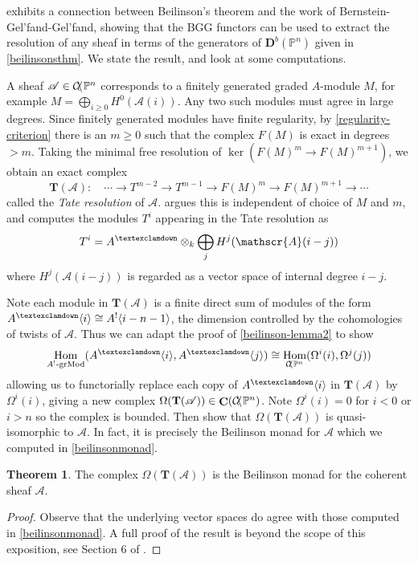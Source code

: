 \documentclass[a4paper]{article}
\theoremstyle{definition}
\newtheorem{theorem}[defn]{Theorem}
\theoremstyle{remark}
\newcommand{\grMod}{\ensuremath{\text{-grMod}}}
\DeclareMathOperator{\Hom}{\text{Hom}}
\DeclareMathOperator{\Ch}{\mathbf{C}}
\newcommand{\deri}{\mathbf{D}}
\newcommand{\Pn}{\ensuremath{{\mathbb{P}^n}}}
\DeclareMathOperator{\coh}{\mathcal{C\kern -2pt o\kern -2pt h\kern -1pt}}
\newcommand{\gnab}{{\textexclamdown}}
\begin{document}
 exhibits a connection between Beilinson's
theorem and the work of Bernstein-Gel'fand-Gel'fand, showing that the BGG
functors can be used to extract the resolution of any sheaf in terms of the
generators of \(\deri^b(\Pn)\) given in \cref{beilinsonsthm}. We state the
result, and look at some computations.

A sheaf \(\mathscr{A}\in \coh\Pn\) corresponds to a finitely generated graded
\(A\)-module \(M\), for example \(M=\bigoplus_{i\geq 0}H^0(\mathscr{A}(i))\).
Any two such modules must agree in large degrees. Since finitely generated
modules have finite regularity, by \cref{regularity-criterion} there is an
\(m\geq 0\) such that the complex \(F(M)\) is exact in degrees \(>m\). Taking
the minimal free resolution of \(\ker(F(M)^m\rightarrow F(M)^{m+1})\), we obtain
an exact complex 
\[\mathbf{T}(\mathscr{A}): \quad \cdots \rightarrow T^{m-2}\rightarrow T^{m-1}
\rightarrow F(M)^m \rightarrow F(M)^{m+1} \rightarrow \cdots \]
called the \textit{Tate resolution} of \(\mathscr{A}\).
 argues this is independent of choice of \(M\)
and \(m\), and computes the modules \(T^{i}\) appearing in the Tate resolution
as \[T^i=  A^\gnab \otimes_k \bigoplus_jH^j(\mathscr{A}(i-j))\] 
where \(H^j(\mathscr{A}(i-j))\) is regarded as a vector space of internal degree
\(i-j\). 

Note each module in \(\mathbf{T}(\mathscr{A})\) is a finite direct sum of
modules of the form \(A^\gnab\langle i \rangle\cong A^!\langle i-n-1 \rangle\),
the dimension controlled by the cohomologies of twists of \(\mathscr{A}\). Thus
we can adapt the proof of \cref{beilinson-lemma2} to show 
\[\Hom_{A^!\grMod}(A^\gnab \langle i \rangle, A^\gnab \langle j \rangle) \cong
\Hom_{\coh\Pn}(\Omega^i(i),\Omega^j(j)) \]
allowing us to functorially replace each copy of \(A^\gnab \langle i \rangle\)
in \(\mathbf{T}(\mathscr{A})\) by \(\Omega^i(i)\), giving a new complex
\(\Omega(\mathbf{T}(\mathscr{A}))\in \Ch(\coh\Pn)\). Note \(\Omega^i(i)=0\) for
\(i<0\) or \(i>n\) so the complex is bounded. Then
 show that
\(\Omega(\mathbf{T}(\mathscr{A}))\) is quasi-isomorphic to \(\mathscr{A}\). In
fact, it is precisely the Beilinson monad for \(\mathscr{A}\) which we computed
in \cref{beilinsonmonad}.

\begin{theorem}
    The complex \(\Omega(\mathbf{T}(\mathscr{A}))\) is the Beilinson monad for
    the coherent sheaf \(\mathscr{A}\).
    \begin{proof}
        Observe that the underlying vector spaces do agree
        with those computed in \cref{beilinsonmonad}. A full proof of the result
        is beyond the scope of this exposition, see Section 6 of
        .
    \end{proof}
\end{theorem}
\end{document}
